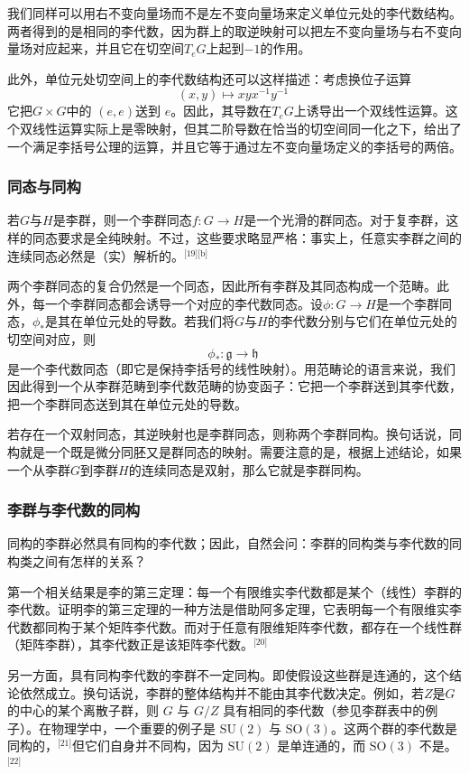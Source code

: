 我们同样可以用右不变向量场而不是左不变向量场来定义单位元处的李代数结构。两者得到的是相同的李代数，因为群上的取逆映射可以把左不变向量场与右不变向量场对应起来，并且它在切空间$T_{e}G$上起到$-1$的作用。

此外，单位元处切空间上的李代数结构还可以这样描述：考虑换位子运算
$$
(x, y) \mapsto xyx^{-1}y^{-1}~
$$
它把$G \times G$中的 $(e, e)$送到 $e$。因此，其导数在$T_{e}G$上诱导出一个双线性运算。这个双线性运算实际上是零映射，但其二阶导数在恰当的切空间同一化之下，给出了一个满足李括号公理的运算，并且它等于通过左不变向量场定义的李括号的两倍。
\subsubsection{同态与同构}
若$G$与$H$是李群，则一个李群同态$f : G \to H$是一个光滑的群同态。对于复李群，这样的同态要求是全纯映射。不过，这些要求略显严格：事实上，任意实李群之间的连续同态必然是（实）解析的。\(^\text{[19][b]}\)

两个李群同态的复合仍然是一个同态，因此所有李群及其同态构成一个范畴。此外，每一个李群同态都会诱导一个对应的李代数同态。设$\phi : G \to H$是一个李群同态，$\phi_{*}$是其在单位元处的导数。若我们将$G$与$H$的李代数分别与它们在单位元处的切空间对应，则
$$
\phi_{*} : \mathfrak{g} \to \mathfrak{h}~
$$
是一个李代数同态（即它是保持李括号的线性映射）。用范畴论的语言来说，我们因此得到一个从李群范畴到李代数范畴的协变函子：它把一个李群送到其李代数，把一个李群同态送到其在单位元处的导数。

若存在一个双射同态，其逆映射也是李群同态，则称两个李群同构。换句话说，同构就是一个既是微分同胚又是群同态的映射。需要注意的是，根据上述结论，如果一个从李群$G$到李群$H$的连续同态是双射，那么它就是李群同构。
\subsubsection{李群与李代数的同构}
同构的李群必然具有同构的李代数；因此，自然会问：李群的同构类与李代数的同构类之间有怎样的关系？

第一个相关结果是李的第三定理：每一个有限维实李代数都是某个（线性）李群的李代数。证明李的第三定理的一种方法是借助阿多定理，它表明每一个有限维实李代数都同构于某个矩阵李代数。而对于任意有限维矩阵李代数，都存在一个线性群（矩阵李群），其李代数正是该矩阵李代数。\(^\text{[20]}\)

另一方面，具有同构李代数的李群不一定同构。即使假设这些群是连通的，这个结论依然成立。换句话说，李群的整体结构并不能由其李代数决定。例如，若$Z$是$G$的中心的某个离散子群，则 $G$ 与 $G/Z$ 具有相同的李代数（参见李群表中的例子）。在物理学中，一个重要的例子是 $\mathrm{SU}(2)$ 与 $\mathrm{SO}(3)$。这两个群的李代数是同构的，\(^\text{[21]}\)但它们自身并不同构，因为 $\mathrm{SU}(2)$ 是单连通的，而 $\mathrm{SO}(3)$ 不是。\(^\text{[22]}\)

